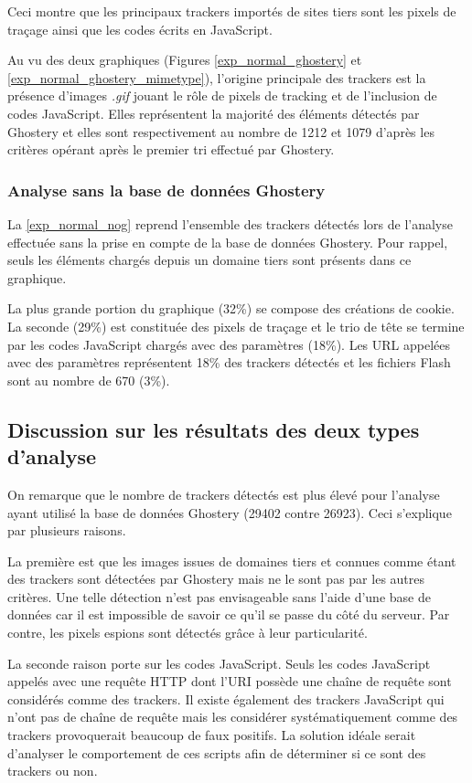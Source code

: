 Ceci montre que les principaux trackers importés de sites tiers sont les pixels de traçage ainsi que les codes écrits en JavaScript.

Au vu des deux graphiques (Figures \ref{exp_normal_ghostery} et \ref{exp_normal_ghostery_mimetype}), l'origine principale des trackers est la présence d'images \textit{.gif} jouant le rôle de pixels de tracking et de l'inclusion de codes JavaScript. Elles représentent la majorité des éléments détectés par Ghostery et elles sont respectivement au nombre de 1212 et 1079 d'après les critères opérant après le premier tri effectué par Ghostery.

\subsubsection{Analyse sans la base de données Ghostery}
La \autoref{exp_normal_nog} reprend l'ensemble des trackers détectés lors de l'analyse effectuée sans la prise en compte de la base de données Ghostery. Pour rappel, seuls les éléments chargés depuis un domaine tiers sont présents dans ce graphique.

La plus grande portion du graphique (32\%) se compose des créations de cookie. La seconde (29\%) est constituée des pixels de traçage et le trio de tête se termine par les codes JavaScript chargés avec des paramètres (18\%). Les URL appelées avec des paramètres représentent 18\% des trackers détectés et les fichiers Flash sont au nombre de 670 (3\%).

\subsection{Discussion sur les résultats des deux types d'analyse}
\label{discussion_analyses}
On remarque que le nombre de trackers détectés est plus élevé pour l'analyse ayant utilisé la base de données Ghostery (29402 contre 26923).
Ceci s'explique par plusieurs raisons.

La première est que les images issues de domaines tiers et connues comme étant des trackers sont détectées par Ghostery mais ne le sont pas par les autres critères. Une telle détection n'est pas envisageable sans l'aide d'une base de données car il est impossible de savoir ce qu'il se passe du côté du serveur. Par contre, les pixels espions sont détectés grâce à leur particularité.

La seconde raison porte sur les codes JavaScript. Seuls les codes JavaScript appelés avec une requête HTTP dont l'URI possède une chaîne de requête sont considérés comme des trackers. Il existe également des trackers JavaScript qui n'ont pas de chaîne de requête mais les considérer systématiquement comme des trackers provoquerait beaucoup de faux positifs. La solution idéale serait d'analyser le comportement de ces scripts afin de déterminer si ce sont des trackers ou non.
\newline

